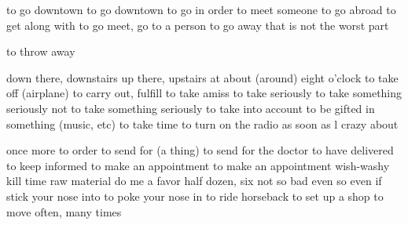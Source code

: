 {to go downtown}
{to go downtown}
{to go in order to meet someone}
{to go abroad}
{to get along with}
{to go meet, go to a person}
{to go away}
{that is not the worst part}

{to throw away}

{down there, downstairs}
{up there, upstairs}
{at about (around) eight o’clock}
{to take off (airplane)}
{to carry out, fulfill}
{to take amiss}
{to take seriously}
{to take something seriously}
{not to take something seriously}
{to take into account}
{to be gifted in something (music, etc)}
{to take time}
{to turn on the radio}
{as soon as l}
{crazy about}

{once more}
{to order}
{to send for (a thing)}
{to send for the doctor}
{to have delivered}
{to keep informed}
{to make an appointment}
{to make an appointment}
{wish-washy}
{kill time}
{raw material}
{do me a favor}
{half dozen, six}
{not so bad}
{even so}
{even if}
{stick your nose into}
{to poke your nose in}
{to ride horseback}
{to set up a shop}
{to move}
{often, many times}

